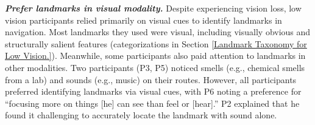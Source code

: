 \textit{\textbf{Prefer landmarks in visual modality.}}\label{Prefer landmarks in visual modality.} Despite experiencing vision loss, low vision participants relied primarily on visual cues to identify landmarks in navigation. Most landmarks they used were visual, including visually obvious and structurally salient features (categorizations in Section \ref{Landmark Taxonomy for Low Vision.}). Meanwhile, some participants also paid attention to landmarks in other modalities. Two participants (P3, P5) noticed smells (e.g., chemical smells from a lab) and sounds (e.g., music) on their routes. %
However, all participants preferred identifying landmarks via visual cues, with P6 noting a preference for ``focusing more on things [he] can see than feel or [hear].'' P2 explained that he found it challenging to accurately locate the landmark with sound alone. %


